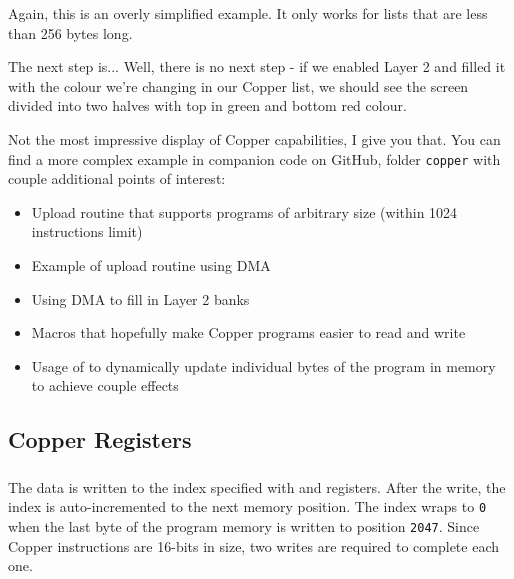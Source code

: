 Again, this is an overly simplified example. It only works for lists that are less than 256 bytes long.

The next step is... Well, there is no next step - if we enabled Layer 2 and filled it with the colour we're changing in our Copper list, we should see the screen divided into two halves with top in green and bottom red colour.

Not the most impressive display of Copper capabilities, I give you that. You can find a more complex example in companion code on GitHub, folder {\tt copper} with couple additional points of interest:

\begin{itemize}[topsep=1pt,itemsep=1pt]
	\item Upload routine that supports programs of arbitrary size (within 1024 instructions limit)
	\item Example of upload routine using DMA
	\item Using DMA to fill in Layer 2 banks
	\item Macros that hopefully make Copper programs easier to read and write
	\item Usage of  to dynamically update individual bytes of the program in memory to achieve couple effects
\end{itemize}


\pagebreak
\subsection{Copper Registers}
\label{zx_next_copper_registers}


\subsubsection{}

\begin{NextPort}
\end{NextPort}

The data is written to the index specified with  and  registers. After the write, the index is auto-incremented to the next memory position. The index wraps to {\tt 0} when the last byte of the program memory is written to position {\tt 2047}. Since Copper instructions are 16-bits in size, two writes are required to complete each one.


